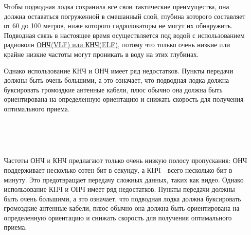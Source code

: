 \documentclass[a4paper,12pt]{article} %
\begin{document}
Чтобы подводная лодка сохранила все свои тактические преимущества, она должна оставаться погруженной в смешанный слой, глубина которого составляет от 60 до 100 метров, ниже которого гидролокаторы не могут их обнаружить. Подводная связь в настоящее время осуществляется под водой с использованием радиоволн \href{https://ru.wikipedia.org/wiki/\%D0\%A1\%D0\%B2\%D0\%B5\%D1\%80\%D1\%85\%D0\%B4\%D0\%BB\%D0\%B8\%D0\%BD\%D0\%BD\%D1\%8B\%D0\%B5_\%D0\%B2\%D0\%BE\%D0\%BB\%D0\%BD\%D1\%8B}{ОНЧ(VLF) или КНЧ(ELF)}, потому что только очень низкие или крайне низкие частоты могут проникать в воду на этих глубинах.

Однако использование КНЧ и ОНЧ имеет ряд недостатков. Пункты передачи должны быть очень большими, а это означает, что подводная лодка должна буксировать громоздкие антенные кабели, плюс обычно она должна быть ориентирована на определенную ориентацию и снижать скорость для получения оптимального приема.

~\\~

\noindent%
\begin{minipage}{\linewidth}%
\label{SVM}%
\end{minipage}

~\\

Частоты ОНЧ и КНЧ предлагают только очень низкую полосу пропускания: ОНЧ поддерживает несколько сотен бит в секунду, а КНЧ - всего несколько бит в минуту. Это предотвращает передачу сложных данных, таких как видео.
Однако использование КНЧ и ОНЧ имеет ряд недостатков. Пункты передачи должны быть очень большими, а это означает, что подводная лодка должна буксировать громоздкие антенные кабели, плюс обычно она должна быть ориентирована на определенную ориентацию и снижать скорость для получения оптимального приема.
\end{document}
